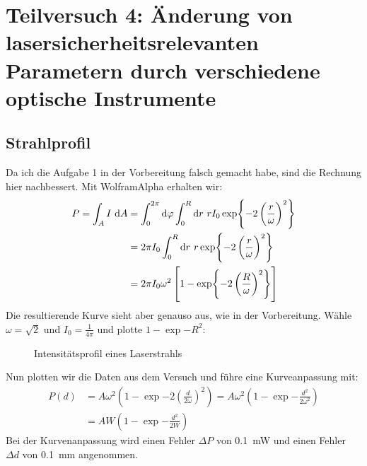 \section{Teilversuch 4: Änderung von lasersicherheitsrelevanten Parametern durch verschiedene optische Instrumente}
	\setcounter{subsection}{2}
	\resnum
	\subsection{Strahlprofil}
		Da ich die Aufgabe 1 in der Vorbereitung falsch gemacht habe, sind die Rechnung hier nachbessert. Mit WolframAlpha erhalten wir:
		\begin{align}
			P = \int_{A} I~\dd A 
			&= \int_{0}^{2\pi} \dd\varphi \int_{0}^{R} \dd r ~ r I_0 \exp{-2\left(\frac{r}{\omega}\right)^2} \notag \\
			&= 2\pi I_0 \int_{0}^{R} \dd r ~ r\exp{-2\left(\frac{r}{\omega}\right)^2} \notag \\
			&= 2\pi I_0 \omega^2 \left[1 - \exp{-2\left(\frac{R}{\omega}\right)^2}\right] \notag
		\end{align}
		Die resultierende Kurve sieht aber genauso aus, wie in der Vorbereitung. Wähle $\omega = \sqrt{2}$ und $I_0 = \frac{1}{4\pi}$ und plotte $1 - \exp{-R^2}$:
		\begin{figure}[H]
			\centering
			
			\caption{\centering Intensitätsprofil eines Laserstrahls}
			\label{fig:tvfour-leistung}
			\vspace{-1em}
		\end{figure}
		Nun plotten wir die Daten aus dem Versuch und führe eine Kurveanpassung mit:
		\begin{align}
			P(d) &= A\omega^2\left(1 - \exp{-2\left(\frac{d}{2\omega}\right)^2}\right) = A\omega^2\left(1 - \exp{-\frac{d^2}{2\omega^2}}\right) \\
			&= AW\left(1 - \exp{-\frac{d^2}{2W}}\right)
		\end{align}
		Bei der Kurvenanpassung wird einen Fehler $\Delta P$ von \SI{0.1}{\milli\watt} und einen Fehler $\Delta d$ von \SI{0.1}{\milli\meter} angenommen.

